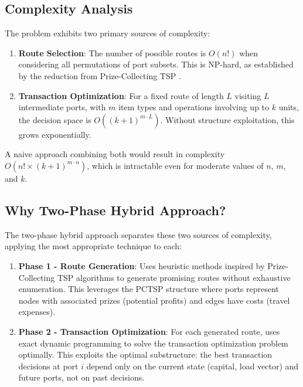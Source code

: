 \documentclass[12pt]{article}
\begin{document}
\subsection{Complexity Analysis}

The problem exhibits two primary sources of complexity:

\begin{enumerate}
    \item \textbf{Route Selection}: The number of possible routes is $O(n!)$ when considering all permutations of port subsets. This is NP-hard, as established by the reduction from Prize-Collecting TSP \cite{reduccion2025}.
    \item \textbf{Transaction Optimization}: For a fixed route of length $L$ visiting $L$ intermediate ports, with $m$ item types and operations involving up to $k$ units, the decision space is $O((k+1)^{m \cdot L})$. Without structure exploitation, this grows exponentially.
\end{enumerate}

A naive approach combining both would result in complexity $O(n! \times (k+1)^{m \cdot n})$, which is intractable even for moderate values of $n$, $m$, and $k$.

\subsection{Why Two-Phase Hybrid Approach?}

The two-phase hybrid approach separates these two sources of complexity, applying the most appropriate technique to each:

\begin{enumerate}
    \item \textbf{Phase 1 - Route Generation}: Uses heuristic methods inspired by Prize-Collecting TSP algorithms to generate promising routes without exhaustive enumeration. This leverages the PCTSP structure where ports represent nodes with associated prizes (potential profits) and edges have costs (travel expenses).
    
    \item \textbf{Phase 2 - Transaction Optimization}: For each generated route, uses exact dynamic programming to solve the transaction optimization problem optimally. This exploits the optimal substructure: the best transaction decisions at port $i$ depend only on the current state (capital, load vector) and future ports, not on past decisions.
\end{enumerate}
\end{document}
